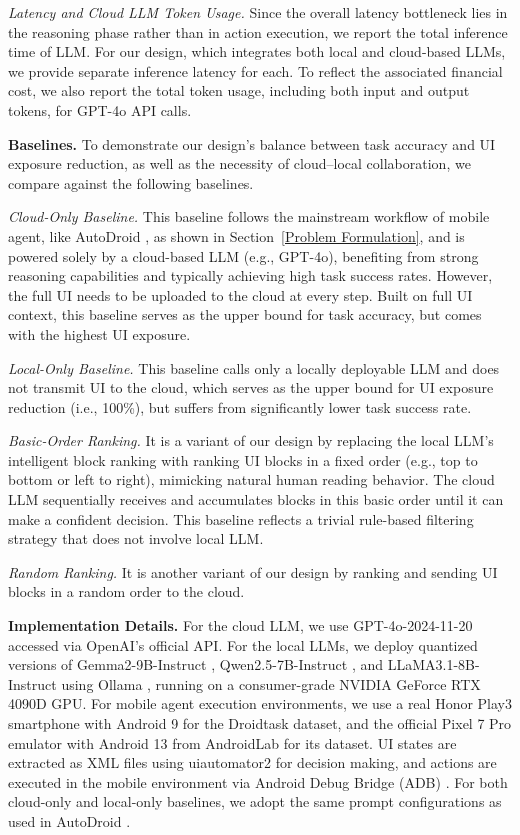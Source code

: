\textit{Latency and Cloud LLM Token Usage.} Since the overall latency bottleneck lies in the reasoning phase rather than in action execution, we report the total inference time of LLM. For our design, which integrates both local and cloud-based LLMs, we provide separate inference latency for each. To reflect the associated financial cost, we also report the total token usage, including both input and output tokens, for GPT-4o API calls.

\textbf{Baselines.} 
To demonstrate our design's balance between task accuracy and UI exposure reduction, as well as the necessity of cloud–local collaboration, we compare against the following baselines.

\textit{Cloud-Only Baseline.} This baseline follows the mainstream workflow of mobile agent, like AutoDroid \citep{wen2024autodroid}, as shown in Section~\ref{Problem Formulation}, and is powered solely by a cloud-based LLM (e.g., GPT-4o), benefiting from strong reasoning capabilities and typically achieving high task success rates. However, the full UI needs to be uploaded to the cloud at every step. Built on full UI context, this baseline serves as the upper bound for task accuracy, but comes with the highest UI exposure.

\textit{Local-Only Baseline.} This baseline calls only a locally deployable LLM and does not transmit UI to the cloud, which serves as the upper bound for UI exposure reduction (i.e., 100\%), but suffers from significantly lower task success rate.

\textit{Basic-Order Ranking.} It is a variant of our design by replacing the local LLM’s intelligent block ranking with ranking UI blocks in a fixed order (e.g., top to bottom or left to right), mimicking natural human reading behavior. The cloud LLM sequentially receives and accumulates blocks in this basic order until it can make a confident decision. This baseline reflects a trivial rule-based filtering strategy that does not involve local LLM.

\textit{Random Ranking.} It is another variant of our design by ranking and sending UI blocks in a random order to the cloud. 


\textbf{Implementation Details.} For the cloud LLM, we use GPT-4o-2024-11-20 \citep{hurst2024gpt} accessed via OpenAI’s official API. For the local LLMs, we deploy quantized versions of Gemma2-9B-Instruct \citep{team2024gemma}, Qwen2.5-7B-Instruct \citep{yang2024qwen2}, and LLaMA3.1-8B-Instruct \citep{grattafiori2024llama} using Ollama \citep{ollama}, running on a consumer-grade NVIDIA GeForce RTX 4090D GPU. For mobile agent execution environments, we use a real Honor Play3 smartphone with Android 9 for the Droidtask dataset, and the official Pixel 7 Pro emulator with Android 13 from AndroidLab for its dataset. UI states are extracted as XML files using uiautomator2 \citep{uiautomator2} for decision making, and actions are executed in the mobile environment via Android Debug Bridge (ADB) \citep{adb}. For both cloud-only and local-only baselines, we adopt the same prompt configurations as used in AutoDroid \citep{wen2024autodroid}.

